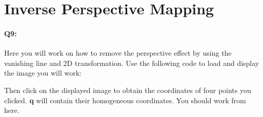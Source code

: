 \documentclass[a4paper]{article}
\begin{document}
%

\section{Inverse Perspective Mapping}
\paragraph{Q9:} Here you will work on how to remove the perspective effect by using the vanishing line and 2D transformation. Use the following code to load and display the image you will work:

Then click on the displayed image to obtain the coordinates of four points you clicked. \textbf{q} will contain their homogeneous coordinates. You should work from here.
\end{document}
